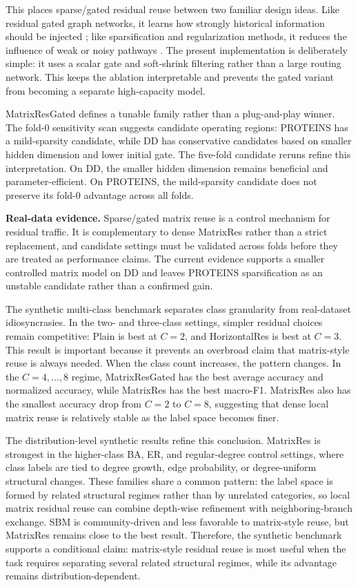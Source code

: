 This places sparse/gated residual reuse between two familiar design ideas. Like residual gated graph networks, it learns how strongly historical information should be injected \cite{bresson2017residual}; like sparsification and regularization methods, it reduces the influence of weak or noisy pathways \cite{rong2019dropedge,cangea2018towards}. The present implementation is deliberately simple: it uses a scalar gate and soft-shrink filtering rather than a large routing network. This keeps the ablation interpretable and prevents the gated variant from becoming a separate high-capacity model.

MatrixResGated defines a tunable family rather than a plug-and-play winner. The fold-0 sensitivity scan suggests candidate operating regions: PROTEINS has a mild-sparsity candidate, while DD has conservative candidates based on smaller hidden dimension and lower initial gate. The five-fold candidate reruns refine this interpretation. On DD, the smaller hidden dimension remains beneficial and parameter-efficient. On PROTEINS, the mild-sparsity candidate does not preserve its fold-0 advantage across all folds.

\textbf{Real-data evidence.} Sparse/gated matrix reuse is a control mechanism for residual traffic. It is complementary to dense MatrixRes rather than a strict replacement, and candidate settings must be validated across folds before they are treated as performance claims. The current evidence supports a smaller controlled matrix model on DD and leaves PROTEINS sparsification as an unstable candidate rather than a confirmed gain.

The synthetic multi-class benchmark separates class granularity from real-dataset idiosyncrasies. In the two- and three-class settings, simpler residual choices remain competitive: Plain is best at \(C=2\), and HorizontalRes is best at \(C=3\). This result is important because it prevents an overbroad claim that matrix-style reuse is always needed. When the class count increases, the pattern changes. In the \(C=4,\ldots,8\) regime, MatrixResGated has the best average accuracy and normalized accuracy, while MatrixRes has the best macro-F1. MatrixRes also has the smallest accuracy drop from \(C=2\) to \(C=8\), suggesting that dense local matrix reuse is relatively stable as the label space becomes finer.

The distribution-level synthetic results refine this conclusion. MatrixRes is strongest in the higher-class BA, ER, and regular-degree control settings, where class labels are tied to degree growth, edge probability, or degree-uniform structural changes. These families share a common pattern: the label space is formed by related structural regimes rather than by unrelated categories, so local matrix residual reuse can combine depth-wise refinement with neighboring-branch exchange. SBM is community-driven and less favorable to matrix-style reuse, but MatrixRes remains close to the best result. Therefore, the synthetic benchmark supports a conditional claim: matrix-style residual reuse is most useful when the task requires separating several related structural regimes, while its advantage remains distribution-dependent.

